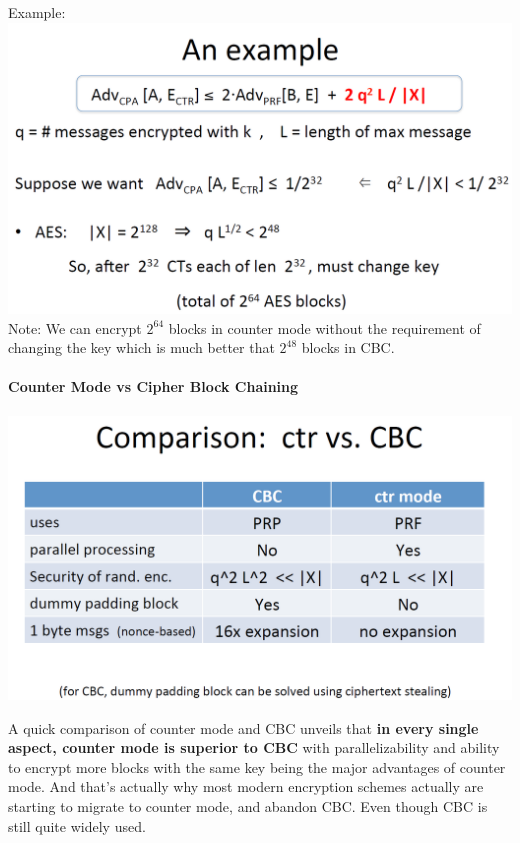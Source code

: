 \documentclass[11pt]{article}
\makeatletter
\def\maxwidth{\ifdim\Gin@nat@width>\linewidth\linewidth
    \else\Gin@nat@width\fi}
\let\Oldincludegraphics\includegraphics
\renewcommand{\includegraphics}[1]{\Oldincludegraphics[width=.8\maxwidth]{#1}}
\makeatother
\begin{document}
Example: \includegraphics{./Images/Counter-CPA-Ex.png} Note: We can
encrypt \(2^{64}\) blocks in counter mode without the requirement of
changing the key which is much better that \(2^{48}\) blocks in CBC.

\hypertarget{counter-mode-vs-cipher-block-chaining}{%
\paragraph{Counter Mode vs Cipher Block
Chaining}\label{counter-mode-vs-cipher-block-chaining}}

\includegraphics{./Images/CounterVsCBC.png}

A quick comparison of counter mode and CBC unveils that \textbf{in every
single aspect, counter mode is superior to CBC} with parallelizability
and ability to encrypt more blocks with the same key being the major
advantages of counter mode. And that's actually why most modern
encryption schemes actually are starting to migrate to counter mode, and
abandon CBC. Even though CBC is still quite widely used.
\end{document}
